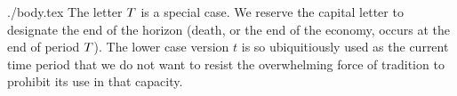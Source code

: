 \documentclass{econtex}
\begin{document}
\begin{verbatimwrite}{./body.tex}
The letter $T$ is a special case.  We reserve the capital letter to designate the end of 
the horizon (death, or the end of the economy, occurs at the end of period $T$).  The lower case version $t$ is so ubiquitiously
used as the current time period that we do not want to resist the overwhelming force of 
tradition to prohibit its use in that capacity.  

\end{verbatimwrite}

\end{document}

